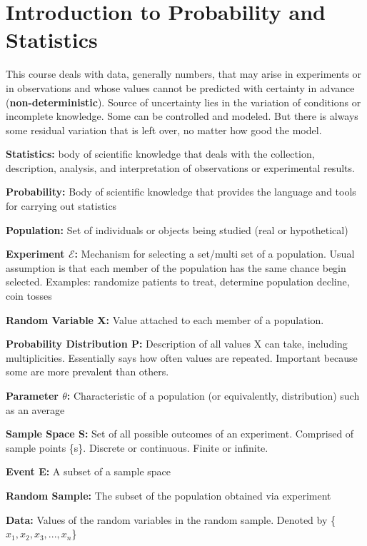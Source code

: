 \documentclass[12pt, titlepage, oneside]{article}
\renewcommand{\b}[1]{\textbf{#1}}
\begin{document}
\tableofcontents

\newpage

\section{Introduction to Probability and Statistics}


This course deals with data, generally numbers, that may arise in experiments or in observations and whose values cannot be predicted with certainty in advance (\b{non-deterministic}). Source of uncertainty lies in the variation of conditions or incomplete knowledge. Some  can be controlled and modeled. But there is always some residual variation that is left over, no matter how good the model.


\b{Statistics:} body of scientific knowledge that deals with the collection, description, analysis, and interpretation of observations or experimental results. 

\b{Probability:} Body  of  scientific  knowledge  that provides  the  language  and  tools  for  carrying out statistics

\b{Population:} Set of individuals or objects being studied (real or hypothetical)
 
\b{Experiment $\mathcal{E}$:} Mechanism for selecting a set/multi set of a population. Usual assumption is that each member of the population has the same chance begin selected. Examples: randomize patients to treat, determine population decline, coin tosses

\b{Random Variable X:} Value attached to each member of a population.

\b{Probability Distribution P:} Description of all values X can take, including multiplicities. Essentially says how often values are repeated. Important because some are more prevalent than others.

\b{Parameter $\theta$:} Characteristic of a population (or equivalently, distribution) such as an average

\b{Sample Space S:} Set of all possible outcomes of an experiment. Comprised of sample points \{s\}. Discrete or continuous. Finite or infinite.

\b{Event E:} A subset of a sample space

\b{Random Sample: } The subset of the population obtained via experiment

\b{Data: } Values of the random variables in the random sample. Denoted by \{ $x_1, x_2, x_3,...,x_n$\}
\end{document}
